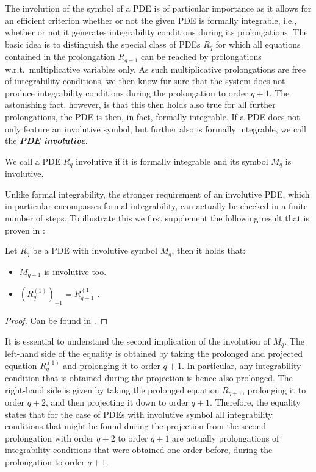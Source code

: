 The involution of the symbol of a PDE is of particular importance as it allows for an efficient criterion whether or not the given PDE is formally integrable, i.e., whether or not it generates integrability conditions during its prolongations.
The basic idea is to distinguish the special class of PDEs $R_q$ for which all equations contained in the prolongation $R_{q+1}$ can be reached by prolongations w.r.t.\ multiplicative variables only. As such multiplicative prolongations are free of integrability conditions, we then know fur sure that the system does not produce integrability conditions during the prolongation to order $q+1$. The astonishing fact, however, is that this then holds also true for all further prolongations, the PDE is then, in fact, formally integrable. 
If a PDE does not only feature an involutive symbol, but further also is formally integrable, we call the \textit{\textbf{PDE involutive}}.
\begin{definition} \label{invol}
We call a PDE $R_q$ involutive if it is formally integrable and its symbol $M_q$ is involutive.
\end{definition}
Unlike formal integrability, the stronger requirement of an involutive PDE, which in particular encompasses formal integrability, can actually be checked in a finite number of steps.
To illustrate this we first supplement the following result that is proven in \cite{seiler1994analysis}:
\begin{theorem}\label{invoCons}
Let $R_q$ be a PDE with involutive symbol $M_q$, then it holds that:
\begin{itemize}
    \item $M_{q+1}$ is involutive too.
    \item $(R_{q}^{(1)})_{+1} = R_{q+1}^{(1)}$ .
\end{itemize}
\end{theorem}
\begin{proof}
Can be found in \cite{seiler1994analysis}.
\end{proof}
It is essential to understand the second implication of the involution of $M_q$. The left-hand side of the equality is obtained by taking the prolonged and projected equation $R_q^{(1)}$ and prolonging it to order $q+1$. In particular, any integrability condition that is obtained during the projection is hence also prolonged. The right-hand side is given by taking the prolonged equation $R_{q+1}$, prolonging it to order $q+2$, and then projecting it down to order $q+1$. Therefore, the equality states that for the case of PDEs with involutive symbol all integrability conditions that might be found during the projection from the second prolongation with order $q+2$ to order $q+1$ are actually prolongations of integrability conditions that were obtained one order before, during the prolongation to order $q+1$.
